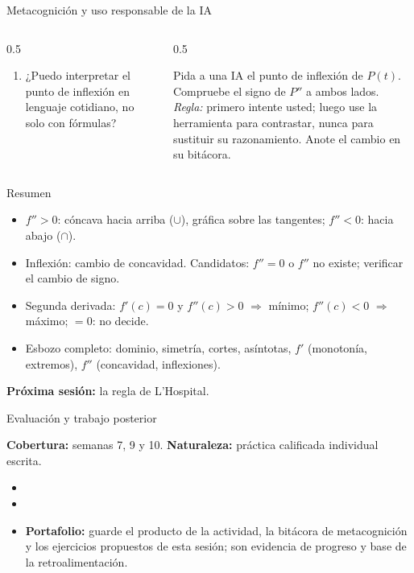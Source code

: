 \documentclass[10pt,aspectratio=169]{beamer}
\begin{document}
\begin{frame}{Metacognición y uso responsable de la IA}
  \small
  \begin{columns}[t]
    \begin{column}{0.5\textwidth}
      \begin{metacog}
        \begin{enumerate}
          \metacomun
          \item ¿Puedo interpretar el punto de inflexión en lenguaje cotidiano, no solo con fórmulas?
        \end{enumerate}
      \end{metacog}
    \end{column}
    \begin{column}{0.5\textwidth}
      \begin{iabox}
        Pida a una IA el punto de inflexión de $P(t)$. Compruebe el signo de $P''$ a ambos lados.\\[2pt]
        \textit{Regla:} primero intente usted; luego use la herramienta para contrastar, nunca para sustituir su razonamiento. Anote el cambio en su bitácora.
      \end{iabox}
    \end{column}
  \end{columns}
\end{frame}

\begin{frame}{Resumen}
  \begin{itemize}
    \item $f''>0$: cóncava hacia arriba ($\cup$), gráfica sobre las tangentes; $f''<0$: hacia abajo ($\cap$).
    \item Inflexión: cambio de concavidad. Candidatos: $f''=0$ o $f''$ no existe; verificar el cambio de signo.
    \item Segunda derivada: $f'(c)=0$ y $f''(c)>0$ $\Rightarrow$ mínimo; $f''(c)<0$ $\Rightarrow$ máximo; $=0$: no decide.
    \item Esbozo completo: dominio, simetría, cortes, asíntotas, $f'$ (monotonía, extremos), $f''$ (concavidad, inflexiones).
  \end{itemize}
  \vspace{3mm}
  \textbf{Próxima sesión:} la regla de L'Hospital.
\end{frame}


\begin{frame}{Evaluación y trabajo posterior}
  \small
  \begin{evalbox}
    \textbf{Cobertura:} semanas 7, 9 y 10. \textbf{Naturaleza:} práctica calificada individual escrita.
  \end{evalbox}
  \begin{itemize}
    \item \criterios
    \item \declaracionia
    \item \textbf{Portafolio:} guarde el producto de la actividad, la bitácora de metacognición y los ejercicios propuestos de esta sesión; son evidencia de progreso y base de la retroalimentación.
  \end{itemize}
\end{frame}
\end{document}
